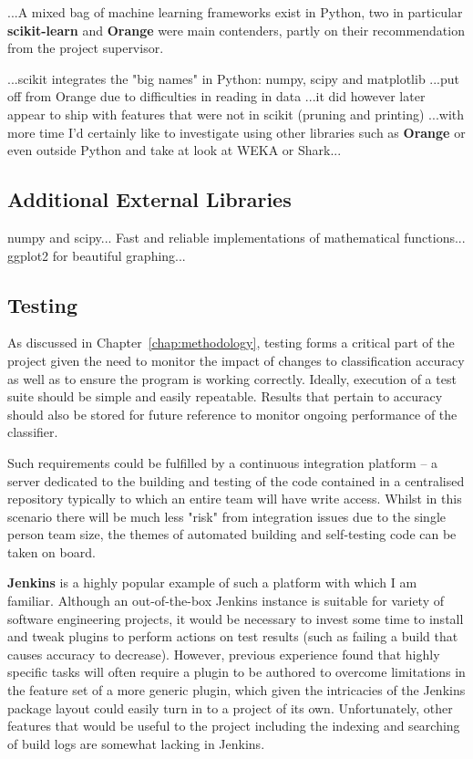 ...A mixed bag of machine learning frameworks exist in Python, two in particular
\textbf{scikit-learn}\citep{scikit-learn} and \textbf{Orange}\citep{orange}
were main contenders, partly on their recommendation from the project
supervisor.

...scikit integrates the "big names" in Python: numpy, scipy and matplotlib
...put off from Orange due to difficulties in reading in data ...it did however
later appear to ship with features that were not in scikit (pruning and
printing) ...with more time I'd certainly like to investigate using other
libraries such as \textbf{Orange} or even outside Python and take at look at WEKA
or Shark...

\subsection{Additional External Libraries}
numpy\citep{numpyscipy} and scipy\citep{scipy}... Fast and reliable implementations of
mathematical functions...  ggplot2\citep{ggplot2} for beautiful graphing...


\subsection{Testing}

As discussed in Chapter~\ref{chap:methodology}, testing forms a critical part of
the project given the need to monitor the impact of changes to classification
accuracy as well as to ensure the program is working correctly. Ideally,
execution of a test suite should be simple and easily repeatable. Results that
pertain to accuracy should also be stored for future reference to monitor
ongoing performance of the classifier.

Such requirements could be fulfilled by a continuous integration platform -- a
server dedicated to the building and testing of the code contained in a
centralised repository typically to which an entire team will have write
access\citep{fowler-ci}. Whilst in this scenario there will be much less "risk"
from integration issues due to the single person team size, the themes of
automated building and self-testing code can be taken on board.

\textbf{Jenkins} is a highly popular\cite{jenkins-stats} example of such a
platform with which I am familiar. Although an out-of-the-box Jenkins instance is
suitable for variety of software engineering projects, it would be necessary to
invest some time to install and tweak plugins to perform actions on test results
(such as failing a build that causes accuracy to decrease). However, previous
experience found that highly specific tasks will often require a plugin to be
authored to overcome limitations in the feature set of a more generic plugin,
which given the intricacies of the Jenkins package layout could easily
turn in to a project of its own. Unfortunately, other features that would be
useful to the project including the indexing and searching of build logs are
somewhat lacking in Jenkins.

